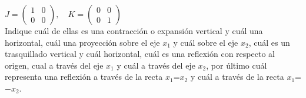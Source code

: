 \begin{exercise}
$ J=\left(\begin{array}{cc} 1& 0 \\0 & 0
\end{array}
\right),\quad K=\left(\begin{array}{cc} 0& 0 \\0 & 1
\end{array}
\right) $\\

Indique cuál de ellas es una contracción o expansión vertical y cu\'al una horizontal, cu\'al una proyección sobre el eje $x_1$ y cuál sobre el eje $x_2$, cu\'al es un trasquillado vertical y cuál horizontal, cuál es una reflexión con respecto al origen, cual a través del eje $x_1$ y cu\'al a través del eje $x_2$, por último cuál representa una reflexión a través de la recta $x_1$=$x_2$ y cuál a través de la recta  $x_1$=$- x_2$. 
\end{exercise}


